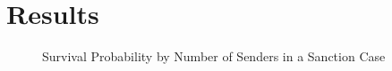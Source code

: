 \section{Results}
\label{Results} 



\begin{figure}[ht]
	\centering
	\caption{Survival Probability by Number of Senders in a Sanction Case}
	\resizebox{1\textwidth}{!}{}
\end{figure}

\begin{figure}[ht]
	\centering
	\resizebox{1\textwidth}{!}{}	
\end{figure}

\begin{figure}[ht]
	\centering
	\resizebox{1\textwidth}{!}{}	
\end{figure}


